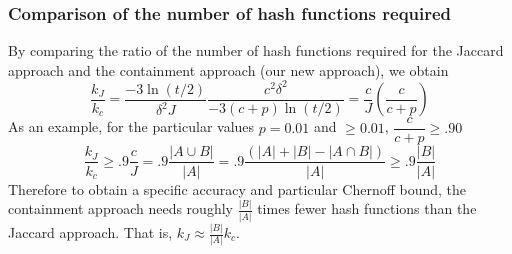 \documentclass[11pt]{amsart}
\theoremstyle{remark}
\numberwithin{equation}{section}
\begin{document}
\subsubsection{Comparison of the number of hash functions required}
By comparing the ratio of the number of hash functions required for the Jaccard approach and the containment approach (our new approach), we obtain
$$\dfrac{k_J}{k_c}=\dfrac{-3\ln(t/2)}{\delta^2 J} \dfrac{c^2\delta^2}{-3(c+p)\ln(t/2)}=\dfrac{c}{J}\left(\dfrac{c}{c+p}\right)$$
As an example, for the particular values $p=0.01$ and $\geq0.01$, $ \dfrac{c}{c+p}\geq.90$
$$\dfrac{k_J}{k_c}\geq .9\frac{c}{J}=.9 \dfrac{|A\cup B|}{|A|}=.9 \dfrac{(|A|+|B|-|A\cap B|)}{|A|}\geq .9 \dfrac{|B|}{|A|}$$
Therefore to obtain a specific accuracy and particular Chernoff bound, the containment approach needs roughly $\frac{|B|}{|A|}$ times fewer hash functions than the Jaccard approach. That is, $k_J \approx\frac{|B|}{|A|}k_c$. 
\end{document}
